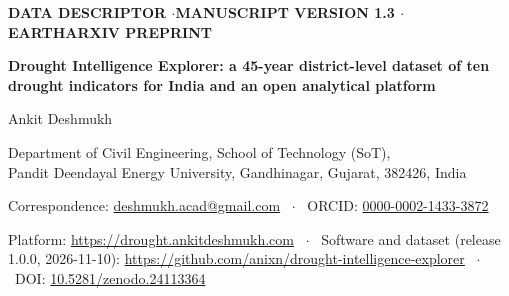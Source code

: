 \documentclass[10pt,a4paper]{article}
\begin{document}
\begin{center}
{\footnotesize\bfseries\color{gray!60!black} DATA DESCRIPTOR \quad$\cdot$\quad MANUSCRIPT VERSION 1.3 \quad$\cdot$\quad EARTHARXIV PREPRINT}\\[10pt]
{\LARGE\bfseries Drought Intelligence Explorer: a 45-year district-level dataset of ten drought indicators for India and an open analytical platform\par}
\vspace{14pt}
{\large Ankit Deshmukh\par}
\vspace{4pt}
{\small Department of Civil Engineering, School of Technology (SoT),\\Pandit Deendayal Energy University, Gandhinagar, Gujarat, 382426, India\par}
\vspace{2pt}
{\small * Correspondence: \href{mailto:deshmukh.acad@gmail.com}{deshmukh.acad@gmail.com} \ $\cdot$ \ ORCID: \href{https://orcid.org/0000-0002-1433-3872}{0000-0002-1433-3872}\par}
\vspace{2pt}
{\small Platform: \url{https://drought.ankitdeshmukh.com} \ $\cdot$ \ Software and dataset (release 1.0.0, 2026-11-10): \url{https://github.com/anixn/drought-intelligence-explorer} \ $\cdot$ \ DOI: \href{https://doi.org/10.5281/zenodo.24113364}{10.5281/zenodo.24113364}\par}
\vspace{8pt}
\end{center}

\vspace{6pt}
\end{document}
